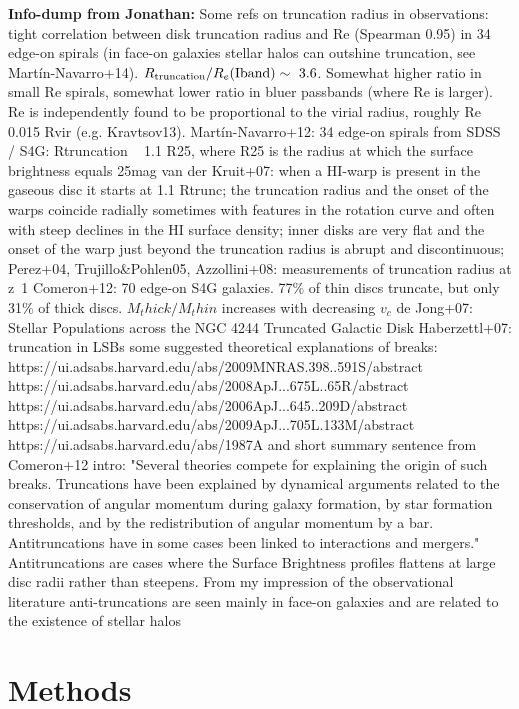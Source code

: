\documentclass[fleqn,usenatbib]{mnras}
\begin{document}
\textbf{Info-dump from Jonathan:}
Some refs on truncation radius in observations:
\cite{Kregel2002} tight correlation between disk truncation radius and Re (Spearman 0.95) in 34 edge-on spirals (in face-on galaxies stellar halos can outshine truncation, see Martín-Navarro+14). $R_{\rm truncation} / R_e({\rm Iband}) \sim~ 3.6$. Somewhat higher ratio in small Re spirals, somewhat lower ratio in bluer passbands (where Re is larger).
Re is independently found to be proportional to the virial radius, roughly Re ~ 0.015 Rvir (e.g. Kravtsov13).
Martín-Navarro+12: 34 edge-on spirals from SDSS / S4G: Rtruncation ~ 1.1 R25, where R25 is the radius at which the surface brightness equals 25mag
van der Kruit+07: when a HI-warp is present in the gaseous disc it starts at 1.1 Rtrunc; the truncation radius and the onset of the warps coincide radially sometimes with features in the rotation curve and often with steep declines in the HI surface density; inner disks are very flat and the onset of the warp just beyond the truncation radius is abrupt and discontinuous;
Perez+04, Trujillo\&Pohlen05, Azzollini+08: measurements of truncation radius at z~1
Comeron+12: 70 edge-on S4G galaxies. 77\% of thin discs truncate, but only 31\% of thick discs. $M_thick/M_thin$ increases with decreasing $v_c$
de Jong+07: Stellar Populations across the NGC 4244 Truncated Galactic Disk
Haberzettl+07: truncation in LSBs
some suggested theoretical explanations of breaks:
https://ui.adsabs.harvard.edu/abs/2009MNRAS.398..591S/abstract
https://ui.adsabs.harvard.edu/abs/2008ApJ...675L..65R/abstract
https://ui.adsabs.harvard.edu/abs/2006ApJ...645..209D/abstract
https://ui.adsabs.harvard.edu/abs/2009ApJ...705L.133M/abstract
https://ui.adsabs.harvard.edu/abs/1987A%
and short summary sentence from Comeron+12 intro:
"Several theories compete for explaining the origin of such breaks. Truncations have been explained by dynamical arguments related to the conservation of angular momentum during galaxy formation, by star formation thresholds, and by the redistribution of angular momentum by a bar. Antitruncations have in some cases been linked to interactions and mergers."
Antitruncations are cases where the Surface Brightness profiles flattens at large disc radii rather than steepens. From my impression of the observational literature anti-truncations are seen mainly in face-on galaxies and are related to the existence of stellar halos

\section{Methods}
\end{document}
